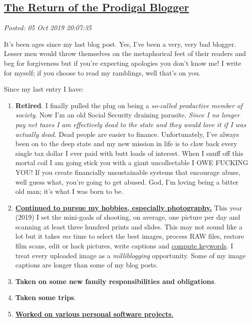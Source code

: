 %

\subsection*{\href{https://analyzethedatanotthedrivel.org/2019/10/05/the-return-of-the-prodigal-blogger/}{The Return of the Prodigal Blogger}}


\noindent\emph{Posted: 05 Oct 2019 20:07:35}
\vspace{6pt}

It's been ages since my last blog post. Yes, I've been a very, very bad
blogger. Lesser men would throw themselves on the metaphorical feet of
their readers and beg for forgiveness but if you're expecting apologies
you don't know me! I write for myself; if you choose to read my
ramblings, well that's on you.

Since my last entry I have:

\begin{enumerate}
\item
  \textbf{Retired}. I finally pulled the plug on being a \emph{so-called
  productive member of society}. Now I'm an old Social Security
  draining parasite. \emph{Since I no longer pay net taxes I am
  effectively dead to the state and they would love it if I was actually
  dead.} Dead people are easier to finance. Unfortunately, I've always
  been on to the deep state and my new mission in life is to claw back
  every single tax dollar I ever paid with butt loads of interest. When
  I snuff off this mortal coil I am going stick you with a giant
  uncollectable I OWE FUCKING YOU! If you create financially
  unsustainable systems that encourage abuse, well guess what, you're
  going to get abused. God, I'm loving being a bitter old man; it's what
  I was born to be.
\item
  \href{https://conceptcontrol.smugmug.com/}{\textbf{\textbf{Continued
  to pursue my hobbies, especially photography.}}} This year (2019) I set
  the mini-goals of shooting, on average, one picture per day and
  scanning at least three hundred prints and slides. This may not sound
  like a lot but it takes \emph{me} time to select the best images,
  process RAW files, restore film scans, edit or hack pictures, write
  captions and
  \href{https://nbviewer.jupyter.org/github/bakerjd99/smugpyter/blob/master/notebooks/Setting\%20SmugMug\%20Print\%20Size\%20and\%20Geotag\%20Keywords\%20with\%20Jupyter\%20and\%20Python.ipynb}{compute
  keywords}. I treat every uploaded image as a
  \emph{milli}\emph{blogging} opportunity. Some of my image captions
  are longer than some of my blog posts. 
\item
  \textbf{Taken on some new family responsibilities and obligations}.
\item
  \textbf{Taken some trips}.
\item
  \href{https://github.com/bakerjd99/smugpyter}{\textbf{Worked on
  various personal software projects}.}
\end{enumerate}

